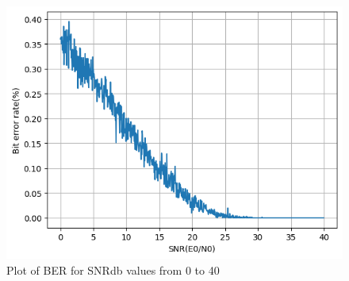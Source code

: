 \begin{figure}[htbp]
    \centering
    \includegraphics[width=\linewidth]{../Source/results/ber}
    \caption{Plot of BER for SNRdb values from 0 to 40}
    \label{ber}
\end{figure}

